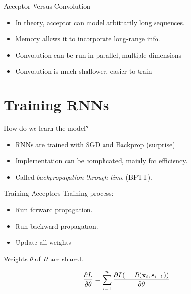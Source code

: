 \documentclass{beamer}
\begin{document}
\begin{frame}{Acceptor Versus Convolution}
  \begin{itemize}
  \item In theory, acceptor can model arbitrarily long sequences.
    \air

  \item Memory allows it to incorporate long-range info.
    \air    

  \item Convolution can be run in parallel, multiple dimensions
    \air

  \item Convolution is much shallower, easier to train

  \end{itemize}
\end{frame}

\section{Training RNNs}

\begin{frame}{How do we learn the model?}
  \begin{itemize}
  \item RNNs are trained with SGD and Backprop (surprise)
    \air 

  \item Implementation can be complicated, mainly for efficiency.
    \air

  \item Called \textit{backpropagation through time} (BPTT).
  \end{itemize}
\end{frame}

\begin{frame}{Training Acceptors}
  Training process:
  \begin{itemize}
  \item Run forward propagation.
    \air 
  \item Run backward propagation.
    \air

  \item Update all weights
  \end{itemize}

  Weights $\theta$ of $R$ are shared:

  \[ \frac{\partial L}{\partial \theta} = \sum_{i = 1}^n \frac{\partial L( \ldots R(\mathbf{x}_i, \mathbf{s}_{i-1})) }{\partial \theta} \] 
\end{frame}
\end{document}
